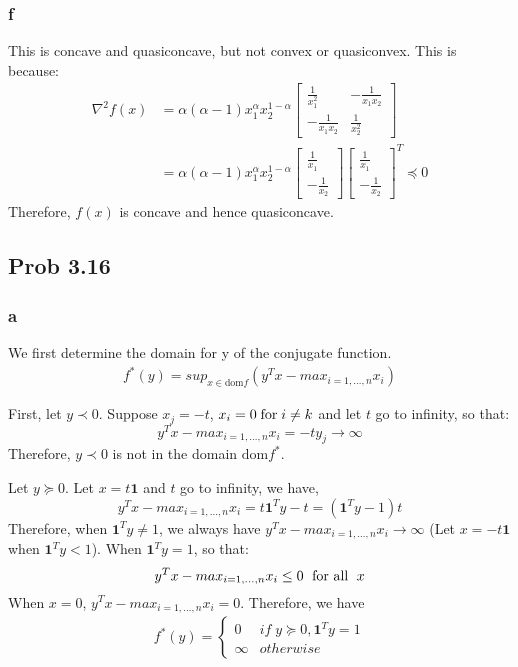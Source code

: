\documentclass[10pt,a4paper]{article}
\begin{document}
\subsubsection{f}
This is concave and quasiconcave, but not convex or quasiconvex. This is because:
\begin{align*}
\nabla^2f(x)&=\alpha(\alpha-1)x_1^\alpha x_2^{1-\alpha}\begin{bmatrix}
\frac{1}{x_1^2} & -\frac{1}{x_1x_2}\\
-\frac{1}{x_1x_2} & \frac{1}{x_2^2}
\end{bmatrix}\\
&=\alpha(\alpha-1)x_1^\alpha x_2^{1-\alpha}\begin{bmatrix}
\frac{1}{x_1}\\
-\frac{1}{x_2}
\end{bmatrix}
\begin{bmatrix}
\frac{1}{x_1}\\
-\frac{1}{x_2}
\end{bmatrix}^T
\preceq 0
\end{align*}
Therefore, $f(x)$ is concave and hence quasiconcave.

\subsection{Prob 3.16}

\subsubsection{a}
We first determine the domain for y of the conjugate function.
\begin{align}
	f^*(y) = sup_{x\in \text{dom}f}(y^Tx-max_{i=1,\dots,n}x_i)
\end{align}

First, let $y\prec0$. Suppose $x_j=-t$, $x_i=0 \text{\;for\;} i \neq k$ and let $t$ go to infinity, so that:
$$
y^Tx-max_{i=1,\dots,n}x_i=-ty_j \rightarrow \infty
$$
Therefore, $y\prec0$ is not in the domain $\text{dom}f^*$.

Let $y\succeq0$. Let $x=t\mathbf{1}$ and $t$ go to infinity, we have,
$$
y^Tx-max_{i=1,\dots,n}x_i=t\mathbf{1}^Ty-t= (\mathbf{1}^Ty-1)t
$$
Therefore, when $\mathbf{1}^Ty \neq 1$, we always have $y^Tx-max_{i=1,\dots,n}x_i\rightarrow \infty$ (Let $x=-t\mathbf{1}$ when $\mathbf{1}^Ty<1$). When $\mathbf{1}^Ty=1$, so that:
$$
y^Tx-max_{i=1,\dots,n}x_i\leq 0 \text{\; for all \;}x
$$
When $x=0$, $y^Tx-max_{i=1,\dots,n}x_i=0$. Therefore, we have
\begin{align*}
	f^*(y)=
	\begin{cases}
	0 & if\; y\succeq0, \mathbf{1}^Ty=1\\
	\infty & otherwise
	\end{cases}
\end{align*}
\end{document}
